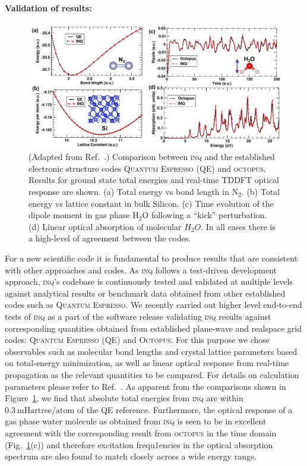 \paragraph{Validation of results:}
\begin{figure}[h]
	\centering
	\includegraphics[width=1.0\linewidth]{figures/Results-Fig.pdf}
	\caption{
		(Adapted from Ref.~\cite{Andrade2021}.) 
		Comparison between \textsc{inq} and the established electronic structure codes \textsc{Quantum Espresso} (QE) and \textsc{octopus}.
Results for ground state total energies and real-time TDDFT optical response are shown. 
		(a) Total energy vs bond length in \(\mathrm{N_2}\).
		(b) Total energy vs lattice constant in bulk Silicon. 
		(c) Time evolution of the dipole moment in gas phase \(\mathrm{H_2O}\) following a ``kick'' perturbation. 
		(d) Linear optical absorption of molecular \(H_2O\). 
		In all cases there is a high-level of agreement between the codes.
	}
	\label{fig:inq_results}
\end{figure}

For a new scientific code it is fundamental to produce results that are consistent with other approaches and codes. 
As \textsc{inq} follows a test-driven development approach, \textsc{inq}'s codebase is continuously tested and validated at multiple levels against analytical results or benchmark data obtained from other established codes such as \textsc{Quantum Espresso}. 
We recently carried out higher level end-to-end tests of \textsc{inq} as a part of the software release validating \textsc{inq} results against corresponding quantities obtained from established plane-wave and realspace grid codes: \textsc{Quantum Espresso} (QE) and \textsc{Octopus}. 
For this purpose we chose observables such as molecular bond lengths and crystal lattice parameters based on total-energy minimization, as well as linear optical response from real-time propagation as the relevant quantities to be compared. 
For details on calculation parameters please refer to Ref.~\cite{Andrade2021}. 
As apparent from the comparisons shown in Figure~\ref{fig:inq_results}, we find that absolute total energies from \textsc{inq} are within \(0.3~\mathrm{mHartree/atom}\) of the QE reference. 
Furthermore, the optical response of a gas phase water molecule as obtained from \textsc{inq} is seen to be in excellent agreement with the corresponding result from \textsc{octopus} in the time domain (Fig.~\ref{fig:inq_results}(c)) and therefore excitation frequ1encies in the optical absorption spectrum are also found to match closely across a wide energy range. 

